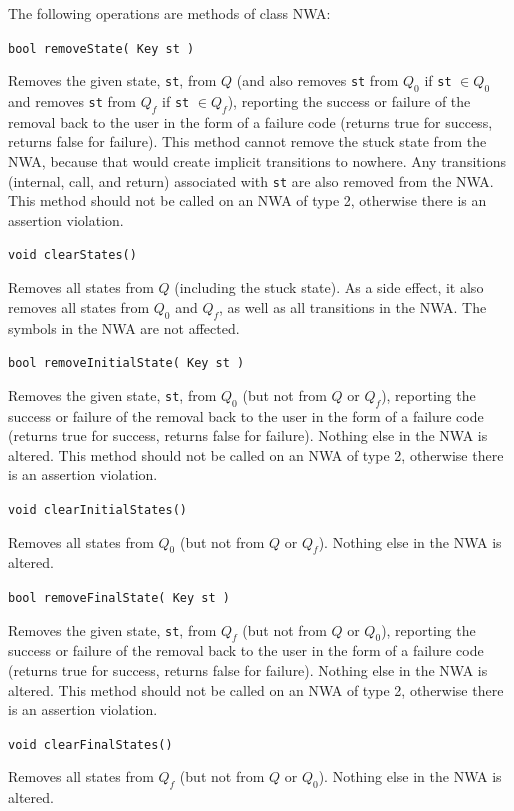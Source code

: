 \documentclass{llncs}
\begin{document}
\noindent The following operations are methods of class NWA:

\begin{description}

  \item\texttt{bool removeState( Key st )}

    Removes the given state, \texttt{st}, from $Q$ (and also removes \texttt{st} from $Q_0$ if \texttt{st} $\in Q_0$ and removes \texttt{st} from $Q_f$ if \texttt{st} $\in Q_f$), reporting the success or failure of the removal back to the user in the form of a failure code (returns true for success, returns false for failure). This method cannot remove the stuck state from the NWA, because that would create implicit transitions to nowhere.  Any transitions (internal, call, and return) associated with \texttt{st} are also removed from the NWA.  This method should not be called on an NWA of type 2, otherwise there is an assertion violation.

  \item\texttt{void clearStates()}

    Removes all states from $Q$ (including the stuck state).  As a side effect, it also removes all states from $Q_0$ and $Q_f$, as well as all transitions in the NWA.  The symbols in the NWA are not affected.

  \item\texttt{bool removeInitialState( Key st )}

    Removes the given state, \texttt{st}, from $Q_0$ (but not from $Q$ or $Q_f$), reporting the success or failure of the removal back to the user in the form of a failure code (returns true for success, returns false for failure).  Nothing else in the NWA is altered.  This method should not be called on an NWA of type 2, otherwise there is an assertion violation.

  \item\texttt{void clearInitialStates()}

    Removes all states from $Q_0$ (but not from $Q$ or $Q_f$).  Nothing else in the NWA is altered.

  \item\texttt{bool removeFinalState( Key st )}

    Removes the given state, \texttt{st}, from $Q_f$ (but not from $Q$ or $Q_0$), reporting the success or failure of the removal back to the user in the form of a failure code (returns true for success, returns false for failure).  Nothing else in the NWA is altered.  This method should not be called on an NWA of type 2, otherwise there is an assertion violation.

  \item\texttt{void clearFinalStates()}

    Removes all states from $Q_f$ (but not from $Q$ or $Q_0$).  Nothing else in the NWA is altered. \\

\end{description}
\end{document}
